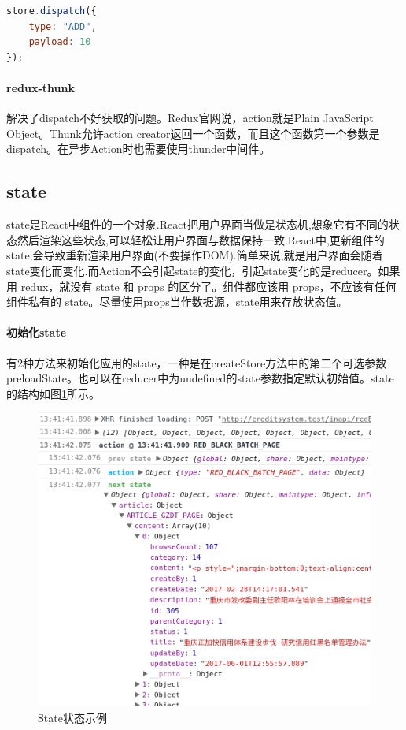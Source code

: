 \documentclass[letter]{book}
\begin{document}
\begin{lstlisting}[language=Javascript]
store.dispatch({
	type: "ADD",
	payload: 10
});
\end{lstlisting}


\paragraph{redux-thunk}

解决了dispatch不好获取的问题。Redux官网说，action就是Plain JavaScript Object。Thunk允许action creator返回一个函数，而且这个函数第一个参数是dispatch。在异步Action时也需要使用thunder中间件。

\subsection{state}

state是React中组件的一个对象.React把用户界面当做是状态机,想象它有不同的状态然后渲染这些状态,可以轻松让用户界面与数据保持一致.React中,更新组件的state,会导致重新渲染用户界面(不要操作DOM).简单来说,就是用户界面会随着state变化而变化.而Action不会引起state的变化，引起state变化的是reducer。如果用 redux，就没有 state 和 props 的区分了。组件都应该用 props，不应该有任何组件私有的 state。尽量使用props当作数据源，state用来存放状态值。

\paragraph{初始化state}

有2种方法来初始化应用的state，一种是在createStore方法中的第二个可选参数preloadState。也可以在reducer中为undefined的state参数指定默认初始值。state的结构如图\ref{fig:statedemo}所示。

\begin{figure}[htbp]
	\centering
	\includegraphics[scale=0.6]{statedemo.png}
	\caption{State状态示例}
	\label{fig:statedemo}
\end{figure}
\end{document}
